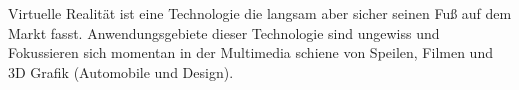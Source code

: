 
Virtuelle Realität ist eine Technologie die langsam aber sicher seinen Fuß auf dem Markt fasst. Anwendungsgebiete dieser Technologie sind
ungewiss und Fokussieren sich momentan in der Multimedia schiene von Speilen, Filmen und 3D Grafik (Automobile und Design). 

